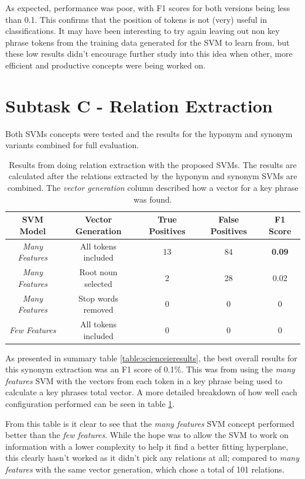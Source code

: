 As expected, performance was poor, with F1 scores for both versions being less than 0.1. This confirms that the position of tokens is not (very) useful in classifications. It may have been interesting to try again leaving out non key phrase tokens from the training data generated for the SVM to learn from, but these low results didn't encourage further study into this idea when other, more efficient and productive concepts were being worked on.

\section{Subtask C - Relation Extraction}

Both SVMs concepts were tested and the results for the hyponym and synonym variants combined for full evaluation.

\begin{table}
	\centering
	\caption[Relation Extraction Specific Results]{Results from doing relation extraction with the proposed SVMs. The results are calculated after the relations extracted by the hyponym and synonym SVMs are combined. The \textit{vector generation} column described how a vector for a key phrase was found.}
	\begin{tabular}{ c | c | c | c | c }
		\textbf{SVM Model} & \textbf{Vector Generation} & \textbf{True Positives} & \textbf{False Positives} & \textbf{F1 Score} \\
		\hline
		\textit{Many Features} & All tokens included & 13 & 84 & \textbf{0.09} \\
		\textit{Many Features} & Root noun selected & 2 & 28 & 0.02 \\
		\textit{Many Features} & Stop words removed & 0 & 0 & 0 \\
		\textit{Few Features} & All tokens included & 0 & 0 & 0 \\
	\end{tabular}
	\label{table:relresults}
\end{table}

As presented in summary table \ref{table:scienceieresults}, the best overall results for this synonym extraction was an F1 score of 0.1\%. This was from using the \textit{many features} SVM with the vectors from each token in a key phrase being used to calculate a key phrases total vector. A more detailed breakdown of how well each configuration performed can be seen in table \ref{table:relresults}. 

From this table is it clear to see that the \textit{many features} SVM concept performed better than the \textit{few features}. While the hope was to allow the SVM to work on information with a lower complexity to help it find a better fitting hyperplane, this clearly hasn't worked as it didn't pick any relations at all; compared to \textit{many features} with the same vector generation, which chose a total of 101 relations. 

